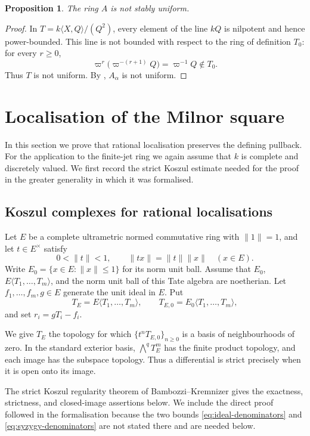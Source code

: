 \documentclass[11pt,reqno]{amsart}
\newtheorem{proposition}[proposition]{Proposition}
\theoremstyle{definition}
\begin{document}
\begin{proposition}\label{prop:not-stably-uniform}
The ring $A$ is not stably uniform.
\end{proposition}

\begin{proof}
In $T=k\langle X,Q\rangle/(Q^2)$, every element of the line $kQ$ is nilpotent and hence power-bounded.  This line is not bounded with respect to the ring of definition $T_0$: for every $r\geq 0$,
\[
  \varpi^r\bigl(\varpi^{-(r+1)}Q\bigr)=\varpi^{-1}Q\notin T_0.
\]
Thus $T$ is not uniform.  By , $A_\alpha$ is not uniform.
\end{proof}


\section{Localisation of the Milnor square}\label{sec:localisation-milnor}

In this section we prove that rational localisation preserves the defining pullback.
For the application to the finite-jet ring we again assume that $k$ is
complete and discretely valued.  We first record the strict Koszul estimate
needed for the proof in the greater generality in which it was formalised.

\subsection{Koszul complexes for rational localisations}

Let $E$ be a complete ultrametric normed commutative ring with
$\lVert1\rVert=1$, and let $t\in E^\times$ satisfy
\[
  0<\lVert t\rVert<1,
  \qquad
  \lVert tx\rVert=\lVert t\rVert\lVert x\rVert
  \quad(x\in E).
\]
Write $E_0=\{x\in E:\lVert x\rVert\leq1\}$ for its norm unit ball.  Assume that $E_0$,
$E\langle T_1,\ldots,T_m\rangle$, and the norm unit ball of this Tate algebra
are noetherian.  Let $f_1,\dots,f_m,g\in E$ generate the unit ideal in $E$.
Put
\[
  T_E=E\langle T_1,\dots,T_m\rangle,
  \qquad
  T_{E,0}=E_0\langle T_1,\dots,T_m\rangle,
\]
and set $r_i=gT_i-f_i$.

We give $T_E$ the topology for which
$\{t^nT_{E,0}\}_{n\geq0}$ is a basis of neighbourhoods of zero.  In the
standard exterior basis, $\bigwedge^qT_E^m$ has the finite product topology,
and each image has the subspace topology.  Thus a differential is strict
precisely when it is open onto its image.

The strict Koszul regularity theorem of
Bambozzi--Kremnizer
\cite[Notation~4.3, Definitions~4.5--4.6, Proposition~4.9,
Lemma~4.11, and Corollary~4.13]{BK} gives the exactness, strictness, and
closed-image assertions below.  We include the direct proof followed in the
formalisation because the two bounds \eqref{eq:ideal-denominators} and
\eqref{eq:syzygy-denominators} are not stated there and are needed below.
\end{document}
